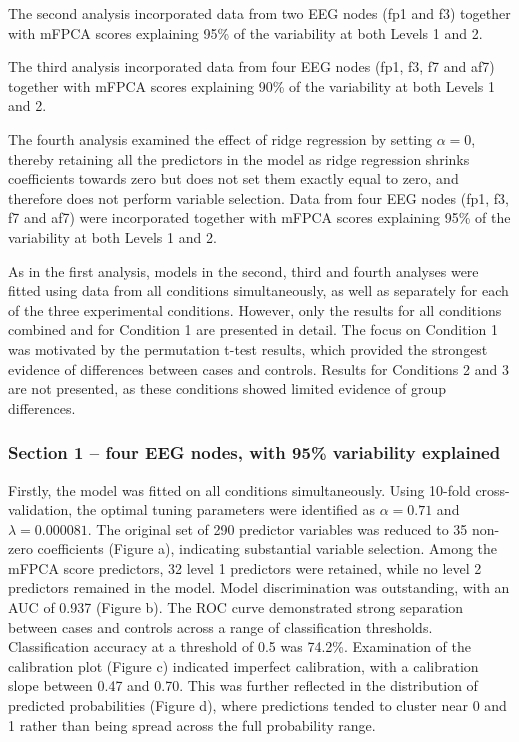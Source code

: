 \documentclass{article}
\begin{document}
The second analysis incorporated data from two EEG nodes (fp1 and f3)
together with mFPCA scores explaining 95\% of the variability at both
Levels 1 and 2.

The third analysis incorporated data from four EEG nodes (fp1, f3, f7
and af7) together with mFPCA scores explaining 90\% of the variability
at both Levels 1 and 2.

The fourth analysis examined the effect of ridge regression by setting
\(\alpha = 0\), thereby retaining all the predictors in the model as
ridge regression shrinks coefficients towards zero but does not set them
exactly equal to zero, and therefore does not perform variable
selection. Data from four EEG nodes (fp1, f3, f7 and af7) were
incorporated together with mFPCA scores explaining 95\% of the
variability at both Levels 1 and 2.

As in the first analysis, models in the second, third and fourth
analyses were fitted using data from all conditions simultaneously, as
well as separately for each of the three experimental conditions.
However, only the results for all conditions combined and for Condition
1 are presented in detail. The focus on Condition 1 was motivated by the
permutation t-test results, which provided the strongest evidence of
differences between cases and controls. Results for Conditions 2 and 3
are not presented, as these conditions showed limited evidence of group
differences.

\subsubsection{Section 1 -- four EEG nodes, with 95\% variability
explained}\label{section-1-four-eeg-nodes-with-95-variability-explained}

Firstly, the model was fitted on all conditions simultaneously. Using
10-fold cross-validation, the optimal tuning parameters were identified
as \(\alpha = 0.71\) and \(\lambda = 0.000081\). The original set of 290
predictor variables was reduced to 35 non-zero coefficients (Figure a),
indicating substantial variable selection. Among the mFPCA score
predictors, 32 level 1 predictors were retained, while no level 2
predictors remained in the model. Model discrimination was outstanding,
with an AUC of 0.937 (Figure b). The ROC curve demonstrated strong
separation between cases and controls across a range of classification
thresholds. Classification accuracy at a threshold of 0.5 was 74.2\%.
Examination of the calibration plot (Figure c) indicated imperfect
calibration, with a calibration slope between 0.47 and 0.70. This was
further reflected in the distribution of predicted probabilities (Figure
d), where predictions tended to cluster near 0 and 1 rather than being
spread across the full probability range.
\end{document}
